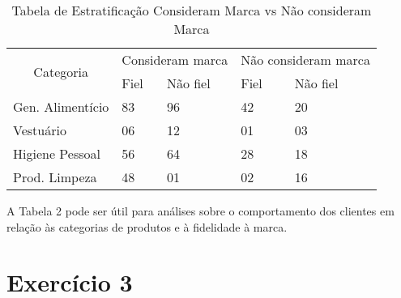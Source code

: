 \documentclass{article}
\begin{document}
\begin{table}[h!]
\centering
\caption{Tabela de Estratificação Consideram Marca vs Não consideram Marca}
\begin{tabular}{|l|ll|ll|}
\hline
\multicolumn{1}{|c|}{\multirow{2}{*}{Categoria}} & \multicolumn{2}{c|}{Consideram marca} & \multicolumn{2}{c|}{Não consideram marca} \\ \cline{2-5} 
\multicolumn{1}{|c|}{}                           & \multicolumn{1}{l|}{Fiel}  & Não fiel & \multicolumn{1}{l|}{Fiel}    & Não fiel   \\ \hline
Gen. Alimentício                                 & \multicolumn{1}{l|}{83}    & 96       & \multicolumn{1}{l|}{42}      & 20         \\ \hline
Vestuário                                        & \multicolumn{1}{l|}{06}    & 12       & \multicolumn{1}{l|}{01}      & 03         \\ \hline
Higiene Pessoal                                  & \multicolumn{1}{l|}{56}    & 64       & \multicolumn{1}{l|}{28}      & 18         \\ \hline
Prod. Limpeza                                    & \multicolumn{1}{l|}{48}    & 01       & \multicolumn{1}{l|}{02}      & 16         \\ \hline
\end{tabular}
\end{table}

A Tabela 2 pode ser útil para análises sobre o comportamento dos clientes em relação às categorias de produtos e à fidelidade à marca.

\section*{Exercício 3}
\end{document}
